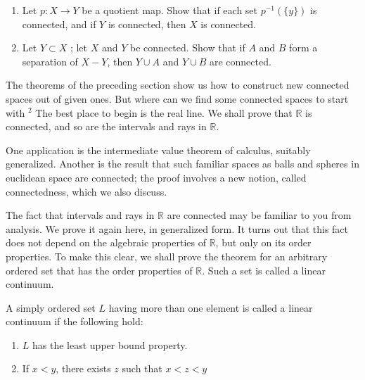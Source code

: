 \begin{enumerate}[itemsep=0.4em, parsep=0pt, topsep=0pt, partopsep=0pt, leftmargin=*, label=\arabic*., ref=\arabic*]
\begin{enumerate}[itemsep=0.2em, parsep=0pt, topsep=0pt, partopsep=0pt, leftmargin=*, label=(\alph*), align=left]
 \item Given any finite subset \(K\) of \(J\), let \(X_{K}\) denote the subspace of \(X\) consisting of all points \(\mathbf{x} = ( x_{\alpha })\) such that \(x_{\alpha } = a_{\alpha }\) for \(\alpha \notin K\). Show that \(X_{K}\) is connected.
 \item Show that the union \(Y\) of the spaces \(X_{K}\) is connected.
 \item Show that \(X\) equals the closure of \(Y\) ; conclude that \(X\) is connected
 \end{enumerate}
\item Let \(p : X \rightarrow Y\) be a quotient map. Show that if each set \(p^{-1}( {\{ y\} })\) is connected, and if \(Y\) is connected, then \(X\) is connected.
\item Let \(Y \subset X\) ; let \(X\) and \(Y\) be connected. Show that if \(A\) and \(B\) form a separation of \(X - Y\), then \(Y \cup A\) and \(Y \cup B\) are connected.
\end{enumerate}

The theorems of the preceding section show us how to construct new connected spaces out of given ones. But where can we find some connected spaces to start with \({}^{2}\) The best place to begin is the real line. We shall prove that \(\mathbb{R}\) is connected, and so are the intervals and rays in \(\mathbb{R}\).

One application is the intermediate value theorem of calculus, suitably generalized. Another is the result that such familiar spaces as balls and spheres in euclidean space are connected; the proof involves a new notion, called  connectedness, which we also discuss.

The fact that intervals and rays in \(\mathbb{R}\) are connected may be familiar to you from analysis. We prove it again here, in generalized form. It turns out that this fact does not depend on the algebraic properties of \(\mathbb{R}\), but only on its order properties. To make this clear, we shall prove the theorem for an arbitrary ordered set that has the order properties of \(\mathbb{R}\). Such a set is called a linear continuum.

\begin{definition}
 A simply ordered set \(L\) having more than one element is called a linear continuum if the following hold:

 \begin{enumerate}[itemsep=0.2em, parsep=0pt, topsep=0pt, partopsep=0pt, leftmargin=*, label=(\arabic*), align=left]
 \item \(L\) has the least upper bound property.
 \item If \(x < y\), there exists \(z\) such that \(x < z < y\)
 \end{enumerate}
\end{definition}

